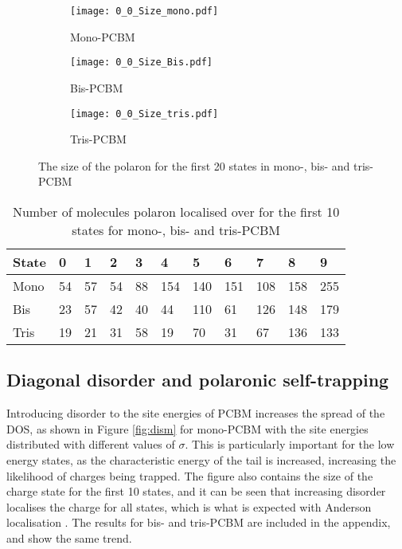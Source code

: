 \documentclass[a4paper,12pt]{article}
\begin{document}
\begin{figure}[H]
\centering
\begin{subfigure}[b]{0.3\textwidth}
\texttt{[image: 0\_0\_Size\_mono.pdf]}
\caption{Mono-PCBM}
\end{subfigure}
\begin{subfigure}[b]{0.3\textwidth}
\texttt{[image: 0\_0\_Size\_Bis.pdf]}
\caption{Bis-PCBM}
\end{subfigure}
\begin{subfigure}[b]{0.3\textwidth}
\texttt{[image: 0\_0\_Size\_tris.pdf]}
\caption{Tris-PCBM}
\end{subfigure}
\caption{The size of the polaron for the first 20 states in mono-, bis- and tris- PCBM}
\label{fig:polaron}
\end{figure}

\begin{table}[H]
\caption{Number of molecules polaron localised over for the first 10 states for mono-, bis- and tris-PCBM}
\centering
\begin{tabular}{lllllllllll}
\hline
State                        & \cellcolor[HTML]{FFFFFF}0  & \cellcolor[HTML]{FFFFFF}1 & \cellcolor[HTML]{FFFFFF}2 & 3  & 4   & 5   & 6   & 7   & 8   & 9   \\ \hline
\cellcolor[HTML]{FFFFFF}Mono & \cellcolor[HTML]{FFFFFF}54 & 57                        & 54                        & 88 & 154 & 140 & 151 & 108 & 158 & 255 \\
\cellcolor[HTML]{FFFFFF}Bis  & 23                         & 57                        & 42                        & 40 & 44  & 110 & 61  & 126 & 148 & 179 \\
Tris                         & 19                         & 21                        & 31                        & 58 & 19  & 70  & 31  & 67  & 136 & 133    \\ \hline
\end{tabular}
\label{table:num}
\end{table}


\subsection{Diagonal disorder and polaronic self-trapping}

\noindent Introducing disorder to the site energies of PCBM increases the spread of the DOS, as shown in Figure \ref{fig:dism} for mono-PCBM with the site energies distributed with different values of $\sigma$. This is particularly important for the low energy states, as the characteristic energy of the tail is increased, increasing the likelihood of charges being trapped. The figure also contains the size of the charge state for the first 10 states, and it can be seen that increasing disorder localises the charge for all states, which is what is expected with Anderson localisation \cite{Anderson1956}. The results for bis- and tris-PCBM are included in the appendix, and show the same trend.\\ 
\end{document}

